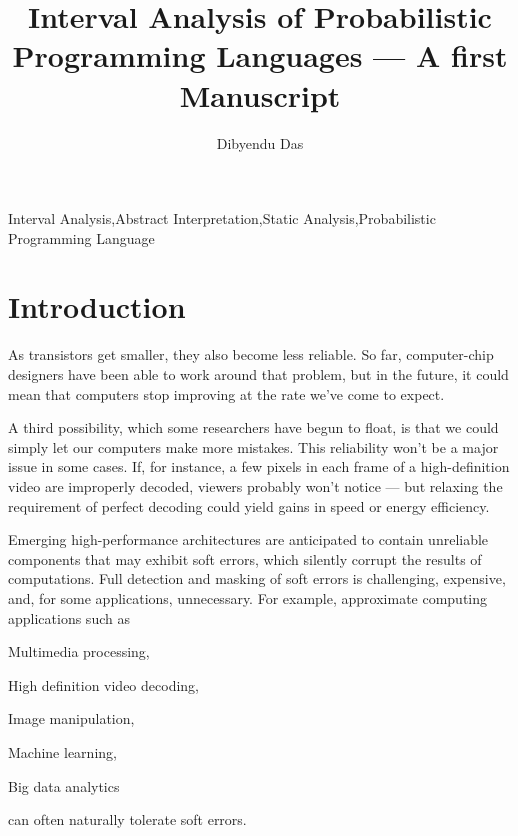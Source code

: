 \documentclass[final,3p, review, times]{util/elsarticle}
\begin{document}
\begin{frontmatter}

\title{Interval Analysis of Probabilistic Programming Languages --- A first Manuscript}

\author[iitkgp]{Dibyendu Das}


\address[iitkgp]{Department of Computer Science \& Engineering, IIT Kharagpur, West Bengal 721302, India}

\begin{abstract}

\end{abstract}

\begin{keyword}
Interval Analysis\sep Abstract Interpretation\sep Static Analysis\sep Probabilistic Programming Language
\end{keyword}

\end{frontmatter}

\section{Introduction}

As transistors get smaller, they also become less reliable. So far, computer-chip designers have been able to work around that problem, but in the future, it could mean that computers stop improving at the rate we’ve come to expect.

A third possibility, which some researchers have begun to float, is that we could simply let our computers make more mistakes. This reliability won't be a major issue in some cases. If, for instance, a few pixels in each frame of a high-definition video are improperly decoded, viewers probably won’t notice --- but relaxing the requirement of perfect decoding could yield gains in speed or energy efficiency.

Emerging high-performance architectures are anticipated to contain unreliable components that may exhibit soft errors, which silently corrupt the results of computations. Full detection and masking of soft errors is challenging, expensive, and, for some applications, unnecessary. For example, approximate computing applications such as
\begin{inparaenum}
  \item Multimedia processing,
  \item High definition video decoding,
  \item Image manipulation,
  \item Machine learning,
  \item Big data analytics
\end{inparaenum}
can often naturally tolerate soft errors.
\end{document}
